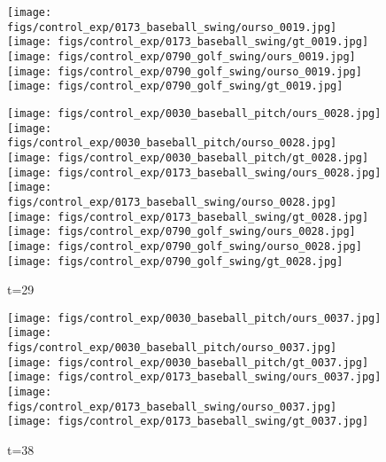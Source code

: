 \documentclass{article}
\begin{document}
\begin{appendix}
\begin{figure*}[!thbp]
\begin{subfigure}{0.12\linewidth}
  		\texttt{[image: figs/control\_exp/0173\_baseball\_swing/ourso\_0019.jpg]}
  		\vspace{.2cm}
  		\texttt{[image: figs/control\_exp/0173\_baseball\_swing/gt\_0019.jpg]}
  		\texttt{[image: figs/control\_exp/0790\_golf\_swing/ours\_0019.jpg]}
  		\texttt{[image: figs/control\_exp/0790\_golf\_swing/ourso\_0019.jpg]}
  		\vspace{.2cm}
  		\texttt{[image: figs/control\_exp/0790\_golf\_swing/gt\_0019.jpg]}
	\end{subfigure} 
    \begin{subfigure}{0.12\linewidth}
        \caption*{t=29}
        \vspace{-7pt}
	    \texttt{[image: figs/control\_exp/0030\_baseball\_pitch/ours\_0028.jpg]}
	    \texttt{[image: figs/control\_exp/0030\_baseball\_pitch/ourso\_0028.jpg]}
	    \vspace{.2cm}
  		\texttt{[image: figs/control\_exp/0030\_baseball\_pitch/gt\_0028.jpg]}
  		\texttt{[image: figs/control\_exp/0173\_baseball\_swing/ours\_0028.jpg]}
  		\texttt{[image: figs/control\_exp/0173\_baseball\_swing/ourso\_0028.jpg]}
  		\vspace{.2cm}
  		\texttt{[image: figs/control\_exp/0173\_baseball\_swing/gt\_0028.jpg]}
  		\texttt{[image: figs/control\_exp/0790\_golf\_swing/ours\_0028.jpg]}
  		\texttt{[image: figs/control\_exp/0790\_golf\_swing/ourso\_0028.jpg]}
  		\vspace{.2cm}
  		\texttt{[image: figs/control\_exp/0790\_golf\_swing/gt\_0028.jpg]}
	\end{subfigure} 
    \begin{subfigure}{0.12\linewidth}
        \caption*{t=38}
        \vspace{-7pt}
	    \texttt{[image: figs/control\_exp/0030\_baseball\_pitch/ours\_0037.jpg]}
	    \texttt{[image: figs/control\_exp/0030\_baseball\_pitch/ourso\_0037.jpg]}
	    \vspace{.2cm}
  		\texttt{[image: figs/control\_exp/0030\_baseball\_pitch/gt\_0037.jpg]}
  		\texttt{[image: figs/control\_exp/0173\_baseball\_swing/ours\_0037.jpg]}
  		\texttt{[image: figs/control\_exp/0173\_baseball\_swing/ourso\_0037.jpg]}
  		\vspace{.2cm}
  		\texttt{[image: figs/control\_exp/0173\_baseball\_swing/gt\_0037.jpg]}

\end{subfigure}
\end{figure*}
\end{appendix}
\end{document}
